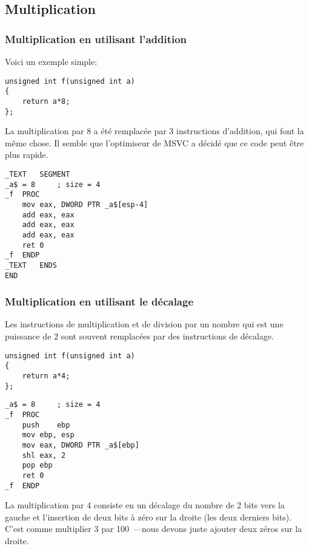 ﻿\subsection{Multiplication}

\subsubsection{Multiplication en utilisant l'addition}

Voici un exemple simple:

\begin{lstlisting}[style=customc]
unsigned int f(unsigned int a)
{
	return a*8;
};
\end{lstlisting}

La multiplication par 8 a été remplacée par 3 instructions d'addition, qui font la
même chose.
Il semble que l'optimiseur de MSVC a décidé que ce code peut être plus rapide.

\begin{lstlisting}[caption=MSVC 2010 \Optimizing,style=customasmx86]
_TEXT	SEGMENT
_a$ = 8		; size = 4
_f	PROC
	mov	eax, DWORD PTR _a$[esp-4]
	add	eax, eax
	add	eax, eax
	add	eax, eax
	ret	0
_f	ENDP
_TEXT	ENDS
END
\end{lstlisting}

\subsubsection{Multiplication en utilisant le décalage}
\label{subsec:mult_using_shifts}

Les instructions de multiplication et de division par un nombre qui est une puissance
de 2 sont souvent remplacées par des instructions de décalage.

\begin{lstlisting}[style=customc]
unsigned int f(unsigned int a)
{
	return a*4;
};
\end{lstlisting}

\begin{lstlisting}[caption=MSVC 2010 \NonOptimizing,style=customasmx86]
_a$ = 8		; size = 4
_f	PROC
	push	ebp
	mov	ebp, esp
	mov	eax, DWORD PTR _a$[ebp]
	shl	eax, 2
	pop	ebp
	ret	0
_f	ENDP
\end{lstlisting}


La multiplication par 4 consiste en un décalage du nombre de 2 bits vers la gauche
et l'insertion de deux bits à zéro sur la droite (les deux derniers bits).
C'est comme multiplier 3 par 100~---nous devons juste ajouter deux zéros sur la droite.

